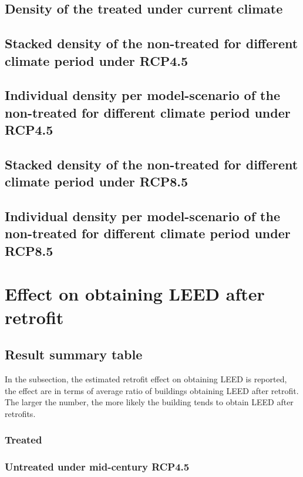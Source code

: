 \documentclass[12pt]{article}
\begin{document}
\subsection{Density of the treated under current climate}

\subsection{Stacked density of the non-treated for different climate period under RCP4.5}

\subsection{Individual density per model-scenario of the non-treated for different
  climate period under RCP4.5}

\subsection{Stacked density of the non-treated for different climate period under RCP8.5}

\subsection{Individual density per model-scenario of the non-treated for different
  climate period under RCP8.5}

\section{Effect on obtaining LEED after retrofit}
\subsection{Result summary table}
In the subsection, the estimated retrofit effect on obtaining LEED
is reported, the effect are in terms of average ratio of buildings obtaining
LEED after retrofit. The larger the number, the more likely the building tends
to obtain LEED after retrofits.
\subsubsection{Treated}




\subsubsection{Untreated under mid-century RCP4.5}




\end{document}

